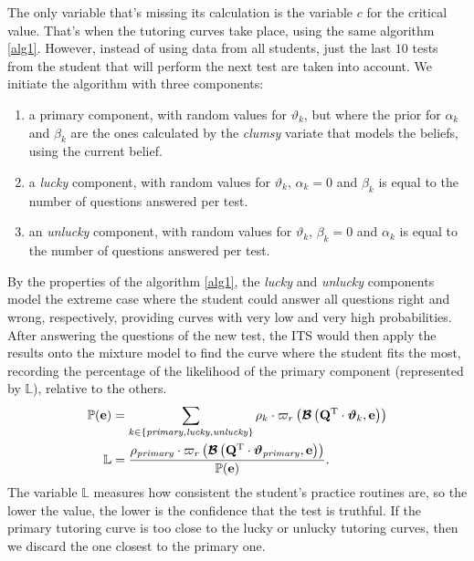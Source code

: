 \documentclass{article}
\newcommand{\0}{\mathbbold{0}}
\newcommand{\1}{\mathds{1}}
\newcommand{\2}{\mathbbold{2}}
\newcommand{\T}{^{\operatorname{T}}}
\begin{document}
The only variable that's missing its calculation is the variable $c$ for the critical value. That's when the tutoring curves take place, using the same algorithm \eqref{alg1}.
However, instead of using data from all students, just the last $10$ tests from the student that will perform the next test are taken into account. We initiate the algorithm with three components:
\begin{enumerate}
    \item a primary component, with random values for $\vartheta_k$, but where the prior for $\alpha_k$ and $\beta_k$ are the ones calculated by the \textsl{clumsy} variate that models the beliefs, using the current belief.
    \item a \textsl{lucky} component, with random values for $\vartheta_k$, $\alpha_k = 0$ and $\beta_k$ is equal to the number of questions answered per test.
    \item an \textsl{unlucky} component, with random values for $\vartheta_k$, $\beta_k = 0$ and $\alpha_k$ is equal to the number of questions answered per test.
\end{enumerate}
By the properties of the algorithm \eqref{alg1}, the \textsl{lucky} and \textsl{unlucky} components model the extreme case where the student could answer all questions right and wrong, respectively, providing curves with very low and very high probabilities.
After answering the questions of the new test, the ITS would then apply the results onto the mixture model to find the curve where the student fits the most, recording the percentage of the likelihood of the primary component (represented by $\mathbb{L}$), relative to the others.
\begin{align*}
    \mathbb{P}({\bf e}) &= \sum_{k \in \left\{\mathit{primary},\mathit{lucky},\mathit{unlucky}\right\}} \rho_k \cdot \varpi_r\left(\boldsymbol{\mathcal{B}}\left({\bf Q}\T \cdot \boldsymbol{\vartheta}_k, {\bf e}\right)\right) \\
    \mathbb{L} &= \frac{\rho_\mathit{primary} \cdot \varpi_r\left(\boldsymbol{\mathcal{B}}\left({\bf Q}\T \cdot \boldsymbol{\vartheta}_\mathit{primary}, {\bf e}\right)\right)}{\mathbb{P}({\bf e})}.
\end{align*}
The variable $\mathbb{L}$ measures how consistent the student's practice routines are, so the lower the value, the lower is the confidence that the test is truthful. If the primary tutoring curve is too close to the lucky or unlucky tutoring curves, then we discard the one closest to the primary one.
\end{document}
